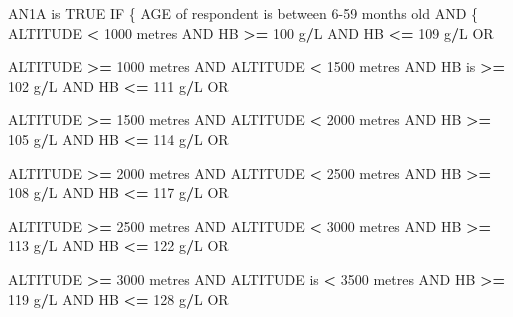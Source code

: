 \documentclass[12pt,a4paper]{article}
\newenvironment{Shaded}{\begin{snugshade}}{\end{snugshade}}
\newcommand{\DecValTok}[1]{\textcolor[rgb]{0.00,0.00,0.81}{#1}}
\newcommand{\NormalTok}[1]{#1}
\newcommand{\OperatorTok}[1]{\textcolor[rgb]{0.81,0.36,0.00}{\textbf{#1}}}
\newcommand{\OtherTok}[1]{\textcolor[rgb]{0.56,0.35,0.01}{#1}}
\newcommand{\StringTok}[1]{\textcolor[rgb]{0.31,0.60,0.02}{#1}}
\begin{document}
\begin{Shaded}
\begin{Highlighting}[]
\NormalTok{AN1A is }\OtherTok{TRUE}\NormalTok{ IF}
\NormalTok{  \{}
\NormalTok{    AGE of respondent is between }\DecValTok{6-59}\NormalTok{ months old AND}
\NormalTok{      \{}
\NormalTok{        ALTITUDE }\OperatorTok{<}\StringTok{ }\DecValTok{1000}\NormalTok{ metres AND HB }\OperatorTok{>=}\StringTok{ }\DecValTok{100}\NormalTok{ g}\OperatorTok{/}\NormalTok{L AND HB }\OperatorTok{<=}\StringTok{ }\DecValTok{109}\NormalTok{ g}\OperatorTok{/}\NormalTok{L OR}
     
\NormalTok{        ALTITUDE }\OperatorTok{>=}\StringTok{ }\DecValTok{1000}\NormalTok{ metres AND ALTITUDE }\OperatorTok{<}\StringTok{ }\DecValTok{1500}\NormalTok{ metres AND }
\NormalTok{          HB is }\OperatorTok{>=}\StringTok{ }\DecValTok{102}\NormalTok{ g}\OperatorTok{/}\NormalTok{L AND HB }\OperatorTok{<=}\StringTok{ }\DecValTok{111}\NormalTok{ g}\OperatorTok{/}\NormalTok{L OR}
     
\NormalTok{        ALTITUDE }\OperatorTok{>=}\StringTok{ }\DecValTok{1500}\NormalTok{ metres AND ALTITUDE }\OperatorTok{<}\StringTok{ }\DecValTok{2000}\NormalTok{ metres AND }
\NormalTok{          HB }\OperatorTok{>=}\StringTok{ }\DecValTok{105}\NormalTok{ g}\OperatorTok{/}\NormalTok{L AND HB }\OperatorTok{<=}\StringTok{ }\DecValTok{114}\NormalTok{ g}\OperatorTok{/}\NormalTok{L OR}

\NormalTok{        ALTITUDE }\OperatorTok{>=}\StringTok{ }\DecValTok{2000}\NormalTok{ metres AND ALTITUDE }\OperatorTok{<}\StringTok{ }\DecValTok{2500}\NormalTok{ metres AND }
\NormalTok{          HB }\OperatorTok{>=}\StringTok{ }\DecValTok{108}\NormalTok{ g}\OperatorTok{/}\NormalTok{L AND HB }\OperatorTok{<=}\StringTok{ }\DecValTok{117}\NormalTok{ g}\OperatorTok{/}\NormalTok{L OR}

\NormalTok{        ALTITUDE }\OperatorTok{>=}\StringTok{ }\DecValTok{2500}\NormalTok{ metres AND ALTITUDE }\OperatorTok{<}\StringTok{ }\DecValTok{3000}\NormalTok{ metres AND }
\NormalTok{          HB }\OperatorTok{>=}\StringTok{ }\DecValTok{113}\NormalTok{ g}\OperatorTok{/}\NormalTok{L AND HB }\OperatorTok{<=}\StringTok{ }\DecValTok{122}\NormalTok{ g}\OperatorTok{/}\NormalTok{L OR}

\NormalTok{        ALTITUDE }\OperatorTok{>=}\StringTok{ }\DecValTok{3000}\NormalTok{ metres AND ALTITUDE is }\OperatorTok{<}\StringTok{ }\DecValTok{3500}\NormalTok{ metres AND }
\NormalTok{          HB }\OperatorTok{>=}\StringTok{ }\DecValTok{119}\NormalTok{ g}\OperatorTok{/}\NormalTok{L AND HB }\OperatorTok{<=}\StringTok{ }\DecValTok{128}\NormalTok{ g}\OperatorTok{/}\NormalTok{L OR}


\end{Highlighting}
\end{Shaded}
\end{document}
